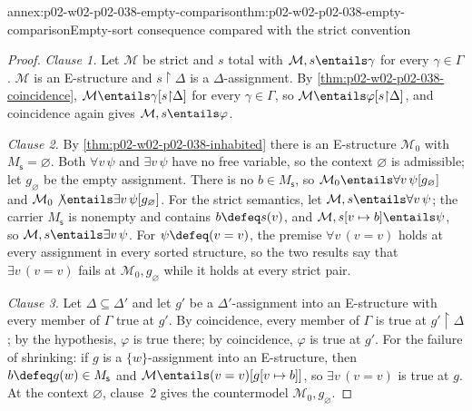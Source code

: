 \begin{annexitem}{annex:p02-w02-p02-038-empty-comparison}{thm:p02-w02-p02-038-empty-comparison}{Empty-sort consequence compared with the strict convention}
\begin{proof}
\emph{Clause 1.}  Let \(\mathcal M\) be strict and \(s\) total with
\(\mathcal M,s\entails\gamma\) for every \(\gamma\in\Gamma\).  \(\mathcal M\) is
an E-structure and \(s{\restriction}\Delta\) is a \(\Delta\)-assignment.  By
\cref{thm:p02-w02-p02-038-coincidence}, \(\mathcal M\entails
\gamma[s{\restriction}\Delta]\) for every \(\gamma\in\Gamma\), so
\(\mathcal M\entails\varphi[s{\restriction}\Delta]\), and coincidence again
gives \(\mathcal M,s\entails\varphi\).

\emph{Clause 2.}  By \cref{thm:p02-w02-p02-038-inhabited} there is an
E-structure \(\mathcal M_0\) with \(M_{\mathsf s}=\varnothing\).  Both
\(\forall v\,\psi\) and \(\exists v\,\psi\) have no free variable, so the
context \(\varnothing\) is admissible; let \(g_{\varnothing}\) be the empty
assignment.  There is no \(b\in M_{\mathsf s}\), so
\(\mathcal M_0\entails\forall v\,\psi[g_{\varnothing}]\) and
\(\mathcal M_0\not\entails\exists v\,\psi[g_{\varnothing}]\).  For the strict
semantics, let \(\mathcal M,s\entails\forall v\,\psi\); the carrier
\(M_{\mathsf s}\) is nonempty and contains \(b\defeq s(v)\), and
\(\mathcal M,s[v\mapsto b]\entails\psi\), so
\(\mathcal M,s\entails\exists v\,\psi\).  For \(\psi\defeq(v=v)\), the
premise \(\forall v\,(v=v)\) holds at every assignment in every sorted
structure, so the two results say that \(\exists v\,(v=v)\) fails at
\(\mathcal M_0,g_{\varnothing}\) while it holds at every strict pair.

\emph{Clause 3.}  Let \(\Delta\subseteq\Delta'\) and let \(g'\) be a
\(\Delta'\)-assignment into an E-structure with every member of \(\Gamma\)
true at \(g'\).  By coincidence, every member of \(\Gamma\) is true at
\(g'{\restriction}\Delta\); by the hypothesis, \(\varphi\) is true there; by
coincidence, \(\varphi\) is true at \(g'\).  For the failure of shrinking: if
\(g\) is a \(\{w\}\)-assignment into an E-structure, then
\(b\defeq g(w)\in M_{\mathsf s}\) and \(\mathcal M\entails(v=v)[g[v\mapsto b]]\),
so \(\exists v\,(v=v)\) is true at \(g\).  At the context \(\varnothing\),
clause~2 gives the countermodel \(\mathcal M_0,g_{\varnothing}\).


\end{proof}
\end{annexitem}
